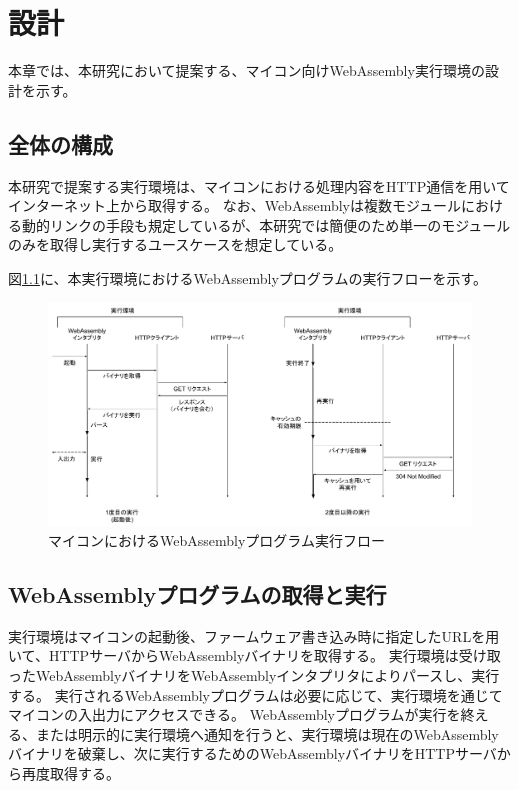 \chapter{設計}
\label{chap:design}

本章では、本研究において提案する、マイコン向けWebAssembly実行環境の設計を示す。

\section{全体の構成}

本研究で提案する実行環境は、マイコンにおける処理内容をHTTP通信を用いてインターネット上から取得する。
なお、WebAssemblyは複数モジュールにおける動的リンクの手段も規定しているが、本研究では簡便のため単一のモジュールのみを取得し実行するユースケースを想定している。

図\ref{fig:wasm_design}に、本実行環境におけるWebAssemblyプログラムの実行フローを示す。

\begin{figure}[htbp]
  \caption{マイコンにおけるWebAssemblyプログラム実行フロー}
  \label{fig:wasm_design}
  \begin{center}
    \includegraphics[bb=0 0 1000 530,width=15cm]{img/wasm_design.pdf}
  \end{center}
\end{figure}

\section{WebAssemblyプログラムの取得と実行}

実行環境はマイコンの起動後、ファームウェア書き込み時に指定したURLを用いて、HTTPサーバからWebAssemblyバイナリを取得する。
実行環境は受け取ったWebAssemblyバイナリをWebAssemblyインタプリタによりパースし、実行する。
実行されるWebAssemblyプログラムは必要に応じて、実行環境を通じてマイコンの入出力にアクセスできる。
WebAssemblyプログラムが実行を終える、または明示的に実行環境へ通知を行うと、実行環境は現在のWebAssemblyバイナリを破棄し、次に実行するためのWebAssemblyバイナリをHTTPサーバから再度取得する。

